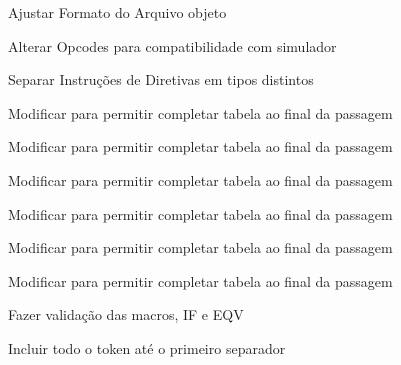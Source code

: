 
\begin{DoxyRefList}
\item[\label{todo__todo000001}%
\hypertarget{todo__todo000001}{}%
Membro \hyperlink{assembler_8h_a368a4f7b83093ab74e79be4ceeb11e3d}{assembler} (int argc, char $\ast$argv\mbox{[}\mbox{]})]Ajustar Formato do Arquivo objeto  
\item[\label{todo__todo000008}%
\hypertarget{todo__todo000008}{}%
Membro \hyperlink{languagedefinition_8h_a1830ff5737e4f1610e975ee2aa489206}{Instruction\-Code} ]Alterar Opcodes para compatibilidade com simulador 

Separar Instruções de Diretivas em tipos distintos  
\item[\label{todo__todo000002}%
\hypertarget{todo__todo000002}{}%
Membro \hyperlink{assembler_8cpp_ad735f823bad61ae08954113bfcaac5ad}{lexical\-Analisis\-Instruction} (int line\-Count, string line, vector$<$ token $>$ vtoks, vector$<$ symbol $>$ $\ast$symbols\-Tb, vector$<$ label $>$ $\ast$labels\-Tb, int $\ast$current\-Symb\-Ad)]Modificar para permitir completar tabela ao final da passagem 

Modificar para permitir completar tabela ao final da passagem 

Modificar para permitir completar tabela ao final da passagem 

Modificar para permitir completar tabela ao final da passagem 

Modificar para permitir completar tabela ao final da passagem 

Modificar para permitir completar tabela ao final da passagem  
\item[\label{todo__todo000010}%
\hypertarget{todo__todo000010}{}%
Membro \hyperlink{macroeval_8h_ab726e2a9f26698bddb5ddd13683e6630}{macroeval} (int argc, char $\ast$$\ast$argv)]Fazer validação das macros, I\-F e E\-Q\-V  
\item[\label{todo__todo000009}%
\hypertarget{todo__todo000009}{}%
Membro \hyperlink{lexer_8h_a63ef6d488951c4541159fe0961565c4d}{scanner} (std\-::string line, int $\ast$position)]Incluir todo o token até o primeiro separador 
\end{DoxyRefList}